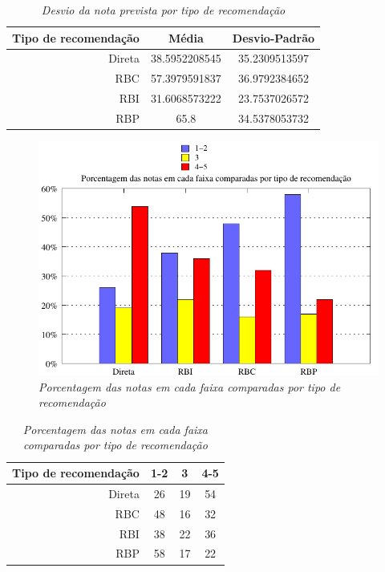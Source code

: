 \begin{table}
\centering
\begin{tabular}{|r|c|c|}
    \hline
    Tipo de recomendação & Média& Desvio-Padrão \\
\hline 
Direta & 38.5952208545 & 35.2309513597 \\
\hline 
RBC & 57.3979591837 & 36.9792384652 \\
\hline 
RBI & 31.6068573222 & 23.7537026572 \\
\hline 
RBP & 65.8 & 34.5378053732 \\
\hline        
\end{tabular}
\caption{\it Desvio da nota prevista por tipo de recomendação}
\label{table:erro}
\end{table}


\begin{figure}
    \centering
    \includegraphics[width=\textwidth]{imagens/grafico_notas}
    \caption{\it Porcentagem das notas em cada faixa comparadas por tipo de recomendação}
    \label{fig:notas}
\end{figure}

\begin{table}
\centering
\begin{tabular}{|r|c|c|c|}
    \hline
    Tipo de recomendação & 1-2& 3& 4-5 \\
\hline 
Direta & 26 & 19 & 54 \\
\hline 
RBC & 48 & 16 & 32 \\
\hline 
RBI & 38 & 22 & 36 \\
\hline 
RBP & 58 & 17 & 22 \\
\hline        
\end{tabular}
\caption{\it Porcentagem das notas em cada faixa comparadas por tipo de recomendação}
\label{table:notas}
\end{table}


